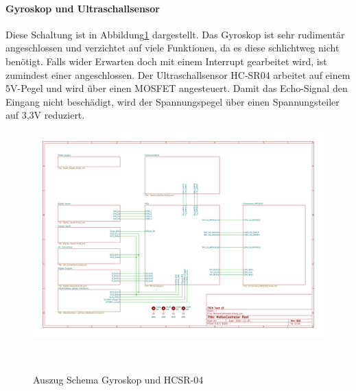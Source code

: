 \documentclass[main.  tex]{subfiles} %
\begin{document}
\paragraph{Gyroskop und Ultraschallsensor}
Diese Schaltung ist in Abbildung\ref{fig:Schema_sonstige_Sensoren} dargestellt.
Das Gyroskop ist sehr rudimentär angeschlossen und verzichtet auf viele
Funktionen, da es diese schlichtweg nicht benötigt. Falls wider Erwarten doch
mit einem Interrupt gearbeitet wird, ist zumindest einer angeschlossen. Der
Ultraschallsensor HC-SR04 arbeitet auf einem 5V-Pegel und wird über einen
MOSFET angesteuert. Damit das Echo-Signal den Eingang nicht beschädigt, wird
der Spannungspegel über einen Spannungsteiler auf 3,3V reduziert.

\begin{figure}[h!]
    \centering
    \includegraphics[page=10,width=\textwidth]{../Anhang_pdfs/MotionController.pdf}
    \caption{Auszug Schema Gyroskop und HCSR-04}~\label{fig:Schema_sonstige_Sensoren}
\end{figure}
\end{document}
